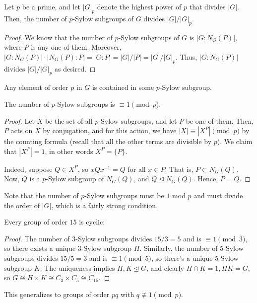 \begin{cor}
    Let $p$ be a prime, and let $|G|_p$ denote the highest power of $p$ that divides $|G|$. Then, the number of $p$-Sylow subgroups of $G$ divides $|G|/|G|_p$.
\end{cor}
\begin{proof}
    We know that the number of $p$-Sylow subgroups of $G$ is $|G:N_G(P)|$, where $P$ is any one of them. Moreover, $|G:N_G(P)| \cdot |N_G(P):P|=|G:P|=|G|/|P|=|G|/|G|_p$. Thus, $|G:N_G(P)|$ divides $|G|/|G|_p$ as desired.
\end{proof}

\begin{cor}
    Any element of order $p$ in $G$ is contained in some $p$-Sylow subgroup.
\end{cor}

\begin{thm}
    The number of $p$-Sylow subgroups is $\equiv 1 \pmod p$.
\end{thm}

\begin{proof}
    Let $X$ be the set of all $p$-Sylow subgroups, and let $P$ be one of them. Then, $P$ acts on $X$ by conjugation, and for this action, we have $|X|\equiv |X^P| \pmod p$ by the counting formula (recall that all the other terms are divisible by $p$). We claim that $|X^P|=1$, in other words $X^P = \{P\}$.

    Indeed, suppose $Q \in X^P$, so $xQx^{-1}=Q$ for all $x \in P$. That is, $P \subset N_G(Q)$. Now, $Q$ is a $p$-Sylow subgroup of $N_G(Q)$, and $Q \unlhd N_G(Q)$. Hence, $P=Q$.
\end{proof}

Note that the number of $p$-Sylow subgroups must be $1$ mod $p$ and must divide the order of $|G|$, which is a fairly strong condition.

\begin{ex}
    Every group of order $15$ is cyclic:
    \begin{proof}
        The number of $3$-Sylow subgroups divides $15/3 = 5$ and is $\equiv 1 \pmod 3$, so there exists a unique $3$-Sylow subgroup $H$. Similarly, the number of $5$-Sylow subgroups divides $15/5=3$ and is $\equiv 1 \pmod 5$, so there's a unique $5$-Sylow subgroup $K$. The uniqueness implies $H,K \unlhd G$, and clearly $H\cap K = 1,HK=G$, so $G \cong H \times K \cong C_3 \times C_5 \cong C_{15}$.
    \end{proof}

    This generalizes to groups of order $pq$ with $q \not \equiv 1 \pmod p$.
\end{ex}

